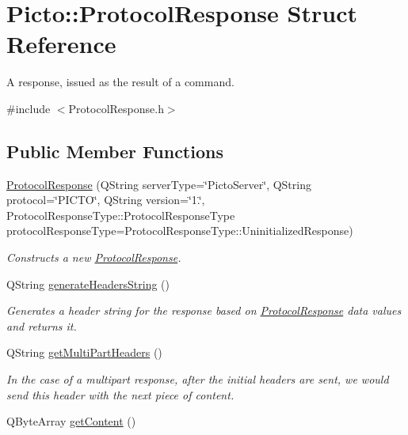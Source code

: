 \hypertarget{struct_picto_1_1_protocol_response}{\section{Picto\-:\-:Protocol\-Response Struct Reference}
\label{struct_picto_1_1_protocol_response}
}


A response, issued as the result of a command.  




{\ttfamily \#include $<$Protocol\-Response.\-h$>$}

\subsection*{Public Member Functions}
\begin{DoxyCompactItemize}
\item 
\hyperlink{struct_picto_1_1_protocol_response_ac07f926cb55d8bc7c10fba9cd1b12a21}{Protocol\-Response} (Q\-String server\-Type=\char`\"{}Picto\-Server\char`\"{}, Q\-String protocol=\char`\"{}P\-I\-C\-T\-O\char`\"{}, Q\-String version=\char`\"{}1.\char`\"{}, Protocol\-Response\-Type\-::\-Protocol\-Response\-Type protocol\-Response\-Type=Protocol\-Response\-Type\-::\-Uninitialized\-Response)
\begin{DoxyCompactList}\small\item\em Constructs a new \hyperlink{struct_picto_1_1_protocol_response}{Protocol\-Response}. \end{DoxyCompactList}\item 
Q\-String \hyperlink{struct_picto_1_1_protocol_response_a16144f811255d4450ec81142145d6ea9}{generate\-Headers\-String} ()
\begin{DoxyCompactList}\small\item\em Generates a header string for the response based on \hyperlink{struct_picto_1_1_protocol_response}{Protocol\-Response} data values and returns it. \end{DoxyCompactList}\item 
Q\-String \hyperlink{struct_picto_1_1_protocol_response_a175376b892e329528d5db6b8318f68b4}{get\-Multi\-Part\-Headers} ()
\begin{DoxyCompactList}\small\item\em In the case of a multipart response, after the initial headers are sent, we would send this header with the next piece of content. \end{DoxyCompactList}\item 
\hypertarget{struct_picto_1_1_protocol_response_a2fab73b8683ab2ca637bcf2d2927e6d7}{Q\-Byte\-Array \hyperlink{struct_picto_1_1_protocol_response_a2fab73b8683ab2ca637bcf2d2927e6d7}{get\-Content} ()}\label{struct_picto_1_1_protocol_response_a2fab73b8683ab2ca637bcf2d2927e6d7}


\end{DoxyCompactItemize}
